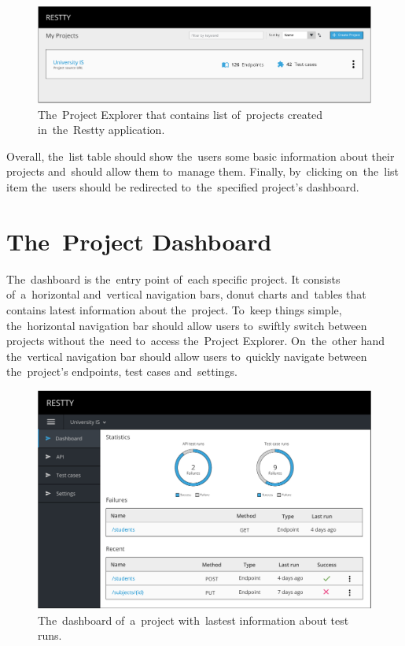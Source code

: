 \begin{figure}[!hbt]
	\centering
	\includegraphics[scale=0.55]{./designs/project-explorer.pdf}
	\caption{The~Project Explorer that contains list of~projects created
	in~the~Restty application.}
\end{figure}

Overall, the~list table should show the~users some basic information about their
projects and~should allow them to~manage them. Finally, by~clicking on~the~list
item the~users should be redirected to~the~specified project's dashboard.


\section{The~Project Dashboard}
The~dashboard is the~entry point of~each specific project. It consists
of~a~horizontal and~vertical navigation bars, donut charts and~tables that
contains latest information about the~project. To~keep things simple,
the~horizontal navigation bar should allow users to~swiftly switch between
projects without the~need to~access the~Project Explorer. On~the~other hand
the~vertical navigation bar should allow users to~quickly navigate between
the~project's endpoints, test cases and~settings.

\begin{figure}[!hbt]
	\centering
	\includegraphics[scale=0.6]{./designs/dashboard.pdf}
	\caption{The~dashboard of~a~project with~lastest information about test runs.}
\end{figure}

